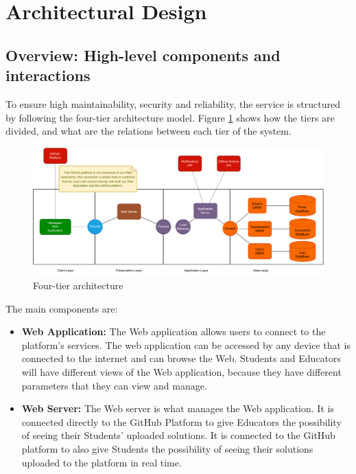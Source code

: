 \documentclass{article}
\begin{document}
{\newpage
\pagestyle{ArchitecturalDesignStyle}

\section{Architectural Design}
    \subsection{Overview: High-level components and interactions}
    To ensure high maintainability, security and reliability, the service is structured by following 
    the four-tier architecture model.
    Figure \ref{fig:fourTierArchitecture} shows how the tiers are divided, and what are the relations between 
    each tier of the system.
    \begin{figure}[H]
        \centering
        \includegraphics[scale=0.5]{images/FourTierApplication.pdf}
        \caption{Four-tier architecture}
        \label{fig:fourTierArchitecture}
    \end{figure}
    \noindent
    The main components are:
    \begin{itemize}
        \item \textbf{Web Application:} The Web application allows users to connect to the platform's 
        services. The web application can be accessed by any device that is connected to the internet 
        and can browse the Web. Students and Educators will have different views of the Web application, 
        because they have different parameters that they can view and manage.\\
        \item \textbf{Web Server:} The Web server is what manages the Web application. It is connected 
        directly to the GitHub Platform to give Educators the possibility of seeing their Students' 
        uploaded solutions. It is connected to the GitHub platform to also give Students the possibility 
        of seeing their solutions uploaded to the platform in real time.

\end{itemize}}
\end{document}
